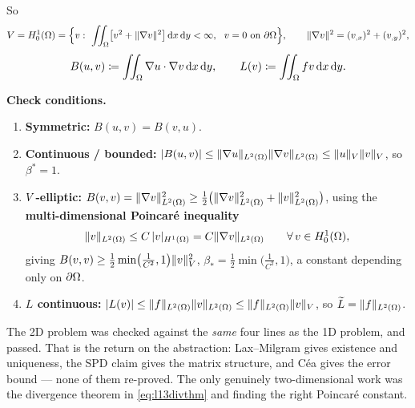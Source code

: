 \noindent
So
\begin{equation}\label{eq:l132dV}
  V=H^{1}_{0}(\Omega)=\Bigl\{v:\ \iint_{\Omega}\bigl[v^{2}+\|\nabla v\|^{2}\bigr]\,\mathrm{d} x\,\mathrm{d} y<\infty,
  \ \ v=0 \text{ on } \partial\Omega\Bigr\},
  \qquad \|\nabla v\|^{2}=(v_{,x})^{2}+(v_{,y})^{2},
\end{equation}
\begin{equation}\label{eq:l132dBL}
  B(u,v)\coloneqq\iint_{\Omega}\nabla u\cdot\nabla v\,\mathrm{d} x\,\mathrm{d} y,
  \qquad
  L(v)\coloneqq\iint_{\Omega}f v\,\mathrm{d} x\,\mathrm{d} y .
\end{equation}

\noindent
\textbf{Check conditions.}
\begin{enumerate}[label=\arabic*),leftmargin=2.2em,itemsep=3pt]
\item \textbf{Symmetric:} $B(u,v)=B(v,u)$. \cmark
\item \textbf{Continuous / bounded:}
  $|B(u,v)|\le\lVert\nabla u\rVert_{L^{2}(\Omega)}\lVert\nabla v\rVert_{L^{2}(\Omega)}
   \le\lVert u\rVert_{V}\lVert v\rVert_{V}$, so $\beta^{*}=1$. \cmark
\item \textbf{$V$-elliptic:}
  $B(v,v)=\lVert\nabla v\rVert^{2}_{L^{2}(\Omega)}
   \ge\tfrac12\bigl(\lVert\nabla v\rVert^{2}_{L^{2}(\Omega)}+\lVert v\rVert^{2}_{L^{2}(\Omega)}\bigr)$,
  using the \textbf{multi-dimensional Poincar\'e inequality}
  \begin{equation}\label{eq:l13poincare2d}
    \lVert v\rVert_{L^{2}(\Omega)}\le C\,|v|_{H^{1}(\Omega)}=C\lVert\nabla v\rVert_{L^{2}(\Omega)}
    \qquad\forall\,v\in H^{1}_{0}(\Omega) ,
  \end{equation}
  giving
  $B(v,v)\ge\tfrac12\min\bigl(\tfrac1{C^{2}},1\bigr)\lVert v\rVert^{2}_{V}$,
  \ie $\beta_{*}=\tfrac12\min\bigl(\tfrac1{C^{2}},1\bigr)$, a constant
  depending only on $\partial\Omega$. \cmark
\item \textbf{$L$ continuous:}
  $|L(v)|\le\lVert f\rVert_{L^{2}(\Omega)}\lVert v\rVert_{L^{2}(\Omega)}\le\lVert f\rVert_{L^{2}(\Omega)}\lVert v\rVert_{V}$,
  so $\widetilde{L}=\lVert f\rVert_{L^{2}(\Omega)}$. \cmark
\end{enumerate}

\begin{intuition}
The 2D problem was checked against the \emph{same} four lines as the 1D
problem, and passed. That is the return on the abstraction: Lax--Milgram gives
existence and uniqueness, the SPD claim gives the matrix structure, and C\'ea
gives the error bound --- none of them re-proved. The only genuinely
two-dimensional work was the divergence theorem in \eqref{eq:l13divthm} and
finding the right Poincar\'e constant.
\end{intuition}

